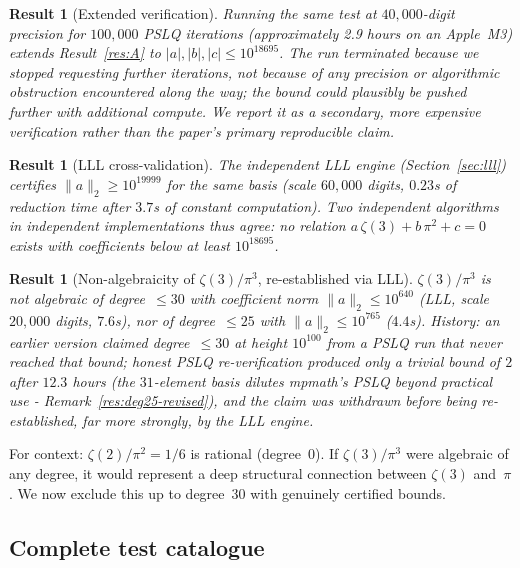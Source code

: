 \documentclass[12pt]{article}
\newtheorem{result}[theorem]{Result}
\theoremstyle{definition}
\theoremstyle{remark}
\begin{document}
\begin{result}[Extended verification]\label{res:A-extended}
Running the same test at $40{,}000$-digit precision for $100{,}000$
PSLQ iterations (approximately 2.9 hours on an Apple~M3) extends
Result~\ref{res:A} to $|a|,|b|,|c|\le 10^{18695}$.  The run terminated
because we stopped requesting further iterations, not because of any
precision or algorithmic obstruction encountered along the way; the
bound could plausibly be pushed further with additional compute.  We
report it as a secondary, more expensive verification rather than the
paper's primary reproducible claim.
\end{result}

\begin{result}[LLL cross-validation]\label{res:A-lll}
The independent LLL engine (Section~\ref{sec:lll}) certifies
$\|a\|_2 \ge 10^{19999}$ for the same basis (scale $60{,}000$ digits,
$0.23$s of reduction time after $3.7$s of constant computation).  Two
independent algorithms in independent implementations thus agree: no
relation $a\,\zeta(3)+b\,\pi^2+c=0$ exists with coefficients below at
least $10^{18695}$.
\end{result}

\begin{result}[Non-algebraicity of $\zeta(3)/\pi^3$, re-established
via LLL]\label{res:B}
$\zeta(3)/\pi^3$ is not algebraic of degree~$\le 30$ with coefficient
norm $\|a\|_2 \le 10^{640}$ (LLL, scale $20{,}000$ digits, $7.6$s),
nor of degree~$\le 25$ with $\|a\|_2 \le 10^{765}$ ($4.4$s).
\emph{History:} an earlier version claimed degree~$\le 30$ at height
$10^{100}$ from a PSLQ run that never reached that bound; honest PSLQ
re-verification produced only a trivial bound of $2$ after $12.3$
hours (the $31$-element basis dilutes mpmath's PSLQ beyond practical
use - Remark~\ref{res:deg25-revised}), and the claim was withdrawn
before being re-established, far more strongly, by the LLL engine.
\end{result}

\noindent For context: $\zeta(2)/\pi^2=1/6$ is rational (degree~0).
If $\zeta(3)/\pi^3$ were algebraic of any degree, it would represent a
deep structural connection between $\zeta(3)$ and~$\pi$.  We now
exclude this up to degree~30 with genuinely certified bounds.


\subsection{Complete test catalogue}\label{sec:catalogue}
\end{document}
